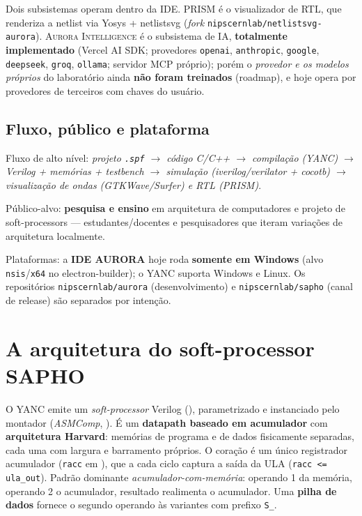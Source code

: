 \documentclass[11pt,a4paper,oneside]{article}
\newcommand{\cmm}{C\textpm{}}
\newcommand{\repo}[1]{\texttt{nipscernlab/#1}}
\newcommand{\file}[1]{\path{#1}}
\newcommand{\tool}[1]{\textsc{#1}}
\newcommand{\code}[1]{\lstinline[basicstyle=\ttfamily]|#1|}
\begin{document}
Dois subsistemas operam dentro da IDE. \tool{PRISM} é o visualizador de RTL, que
renderiza a netlist via Yosys + netlistsvg (\emph{fork} \repo{netlistsvg-aurora}).
\tool{Aurora Intelligence} é o subsistema de IA, \textbf{totalmente
implementado} (Vercel AI SDK; provedores \code{openai}, \code{anthropic},
\code{google}, \code{deepseek}, \code{groq}, \code{ollama}; servidor MCP próprio);
porém o \emph{provedor e os modelos próprios} do laboratório ainda \textbf{não
foram treinados} (roadmap), e hoje opera por provedores de terceiros com chaves
do usuário.

\subsection{Fluxo, público e plataforma}

Fluxo de alto nível: \emph{projeto \code{.spf} $\to$ código \cmm{}/C++ $\to$
compilação (YANC) $\to$ Verilog + memórias + \emph{testbench} $\to$ simulação
(iverilog/verilator + cocotb) $\to$ visualização de ondas (GTKWave/Surfer) e RTL
(PRISM)}.

Público-alvo: \textbf{pesquisa e ensino} em arquitetura de computadores e projeto
de soft-processors --- estudantes/docentes e pesquisadores que iteram variações
de arquitetura localmente.

Plataformas: a \textbf{IDE AURORA} hoje roda \textbf{somente em Windows} (alvo
\code{nsis}/\code{x64} no electron-builder); o \tool{YANC} suporta Windows e
Linux. Os repositórios \repo{aurora} (desenvolvimento) e \repo{sapho} (canal de
release) são separados por intenção.
\section{A arquitetura do soft-processor SAPHO}
\label{sec:S02-soft-processor}

O \tool{YANC} emite um \emph{soft-processor} Verilog (), parametrizado e instanciado pelo montador (\emph{ASMComp}, ). É um \textbf{datapath baseado em acumulador} com \textbf{arquitetura Harvard}: memórias de programa e de dados fisicamente separadas, cada uma com largura e barramento próprios. O coração é um único registrador acumulador (\lstinline|racc| em \file{core.v}), que a cada ciclo captura a saída da ULA (\lstinline|racc <= ula_out|). Padrão dominante \emph{acumulador-com-memória}: operando 1 da memória, operando 2 o acumulador, resultado realimenta o acumulador. Uma \textbf{pilha de dados} fornece o segundo operando às variantes com prefixo \lstinline|S_|.
\end{document}
